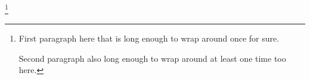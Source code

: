 \footnote{First paragraph here that is long enough to wrap around once for sure.

Second paragraph also long enough to wrap around at least one time too here.}
